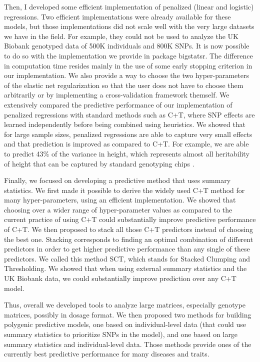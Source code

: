 Then, I developed some efficient implementation of penalized (linear and logistic) regressions. 
Two efficient implementations were already available for these models, but those implementations did not scale well with the very large datasets we have in the field. For example, they could not be used to analyze the UK Biobank genotyped data of 500K individuals and 800K SNPs. 
It is now possible to do so with the implementation we provide in package bigstatsr. 
The difference in computation time resides mainly in the use of some early stopping criterion in our implementation. We also provide a way to choose the two hyper-parameters of the elastic net regularization so that the user does not have to choose them arbitrarily or by implementing a cross-validation framework themself.
We extensively compared the predictive performance of our implementation of penalized regressions with standard methods such as C+T, where SNP effects are learned independently before being combined using heuristics.
We showed that for large sample sizes, penalized regressions are able to capture very small effects and that prediction is improved as compared to C+T.
For example, we are able to predict 43\% of the variance in height, which represents almost all heritability of height that can be captured by standard genotyping chips \cite[]{yang2010common,accuheight2018}.  

Finally, we focused on developing a predictive method that uses summary statistics. We first made it possible to derive the widely used C+T method for many hyper-parameters, using an efficient implementation. 
We showed that choosing over a wider range of hyper-parameter values as compared to the current practice of using C+T could substantially improve predictive performance of C+T.
We then proposed to stack all those C+T predictors instead of choosing the best one. Stacking corresponds to finding an optimal combination of different predictors in order to get higher predictive performance than any single of these predictors. 
We called this method SCT, which stands for Stacked Clumping and Thresholding.
We showed that when using external summary statistics and the UK Biobank data, we could substantially improve prediction over any C+T model.

Thus, overall we developed tools to analyze large matrices, especially genotype matrices, possibly in dosage format.
We then proposed two methods for building polygenic predictive models, one based on individual-level data (that could use summary statistics to prioritize SNPs in the model), and one based on large summary statistics and individual-level data.
Those methods provide ones of the currently best predictive performance for many diseases and traits.   


